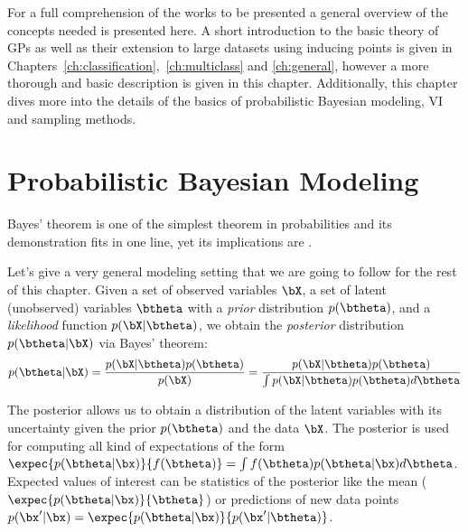 


\graphicspath{{2_background/figures/}}

For a full comprehension of the works to be presented a general overview of the concepts needed is presented here.
A short introduction to the basic theory of \acl{GPs} as well as their extension to large datasets using inducing points \cite{Titsias2009} is given in Chapters~\ref{ch:classification},~\ref{ch:multiclass} and \ref{ch:general}, however a more thorough and basic description is given in this chapter.
Additionally, this chapter dives more into the details of the basics of probabilistic Bayesian modeling, \acl{VI} and sampling methods.


\section{Probabilistic Bayesian Modeling}

\label{sec:prob_bayes}

Bayes' theorem is one of the simplest theorem in probabilities and its demonstration fits in one line, yet its implications are .

Let's give a very general modeling setting that we are going to follow for the rest of this chapter.
Given a set of observed variables $\bX$, a set of latent (unobserved) variables $\btheta$ with a \textit{prior} distribution $p(\btheta)$, and a \textit{likelihood} function $p(\bX|\btheta)$, we obtain the \textit{posterior} distribution $p(\btheta|\bX)$ via Bayes' theorem:
\begin{align}
p(\btheta|\bX) = \frac{p(\bX|\btheta)p(\btheta)}{p(\bX)} = \frac{p(\bX|\btheta)p(\btheta)}{\int p(\bX|\btheta)p(\btheta)d\btheta}
\label{eq:bayes}
\end{align}

The posterior allows us to obtain a distribution of the latent variables with its uncertainty given the prior $p(\btheta)$ and the data $\bX$.
The posterior is used for computing all kind of expectations of the form $\expec{p(\btheta|\bx)}{f(\btheta)} = \int f(\btheta)p(\btheta|\bx)d\btheta$.
Expected values of interest can be statistics of the posterior like the mean ($\expec{p(\btheta|\bx)}{\btheta}$) or predictions of new data points $p(\bx'|\bx) = \expec{p(\btheta|\bx)}{p(\bx'|\btheta)}$.

